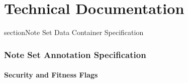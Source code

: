 \chapter{Technical Documentation}
\label{chap:projecttechnicaldocu}

section{Note Set Data Container Specification}

\subsection{Note Set Annotation Specification}
\subsubsection{Security and Fitness Flags}